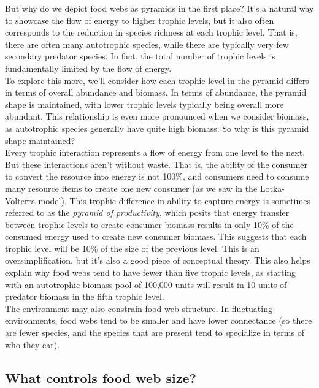 \documentclass[12pt]{article}
\begin{document}
But why do we depict food webs as pyramids in the first place? It's a natural way to showcase the flow of energy to higher trophic levels, but it also often corresponds to the reduction in species richness at each trophic level. That is, there are often many autotrophic species, while there are typically very few secondary predator species. In fact, the total number of trophic levels is fundamentally limited by the flow of energy. \\

To explore this more, we'll consider how each trophic level in the pyramid differs in terms of overall abundance and biomass. In terms of abundance, the pyramid shape is maintained, with lower trophic levels typically being overall more abundant. This relationship is even more pronounced when we consider biomass, as autotrophic species generally have quite high biomass. So why is this pyramid shape maintained? \\


Every trophic interaction represents a flow of energy from one level to the next. But these interactions aren't without waste. That is, the ability of the consumer to convert the resource into energy is not 100\%, and consumers need to consume many resource items to create one new consumer (as we saw in the Lotka-Volterra model). This trophic difference in ability to capture energy is sometimes referred to as the \textit{pyramid of productivity}, which posits that energy transfer between trophic levels to create consumer biomass results in only 10\% of the consumed energy used to create new consumer biomass. This suggests that each trophic level will be 10\% of the size of the previous level. This is an oversimplification, but it's also a good piece of conceptual theory. This also helps explain why food webs tend to have fewer than five trophic levels, as starting with an autotrophic biomass pool of 100,000 units will result in 10 units of predator biomass in the fifth trophic level. \\


The environment may also constrain food web structure. In fluctuating environments, food webs tend to be smaller and have lower connectance (so there are fewer species, and the species that are present tend to specialize in terms of who they eat).  \\




\bigskip
\subsection*{What controls food web size?}
\end{document}
